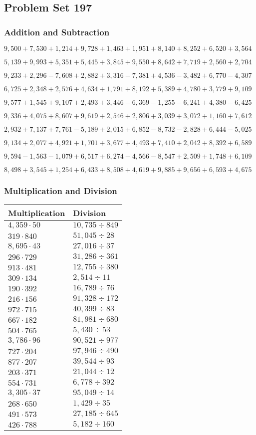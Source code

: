 \hypertarget{problem-set-197}{%
\subsection{Problem Set 197}\label{problem-set-197}}

\hypertarget{addition-and-subtraction}{%
\subsubsection{Addition and
Subtraction}\label{addition-and-subtraction}}

\(9,500+7,530+1,214+9,728+1,463+1,951+8,140+8,252+6,520+3,564\)

\(5,139+9,993+5,351+5,445+3,845+9,550+8,642+7,719+2,560+2,704\)

\(9,233+2,296-7,608+2,882+3,316-7,381+4,536-3,482+6,770-4,307\)

\(6,725+2,348+2,576+4,634+1,791+8,192+5,389+4,780+3,779+9,109\)

\(9,577+1,545+9,107+2,493+3,446-6,369-1,255-6,241+4,380-6,425\)

\(9,336+4,075+8,607+9,619+2,546+2,806+3,039+3,072+1,160+7,612\)

\(2,932+7,137+7,761-5,189+2,015+6,852-8,732-2,828+6,444-5,025\)

\(9,134+2,077+4,921+1,701+3,677+4,493+7,410+2,042+8,392+6,589\)

\(9,594-1,563-1,079+6,517+6,274-4,566-8,547+2,509+1,748+6,109\)

\(8,498+3,545+1,254+6,433+8,508+4,619+9,885+9,656+6,593+4,675\)

\hypertarget{multiplication-and-division}{%
\subsubsection{Multiplication and
Division}\label{multiplication-and-division}}

\begin{longtable}[]{@{}ll@{}}
\toprule
Multiplication & Division\tabularnewline
\midrule
\endhead
\(4,359\cdot50\) & \(10,735÷849\)\tabularnewline
\(319\cdot840\) & \(51,045÷28\)\tabularnewline
\(8,695\cdot43\) & \(27,016÷37\)\tabularnewline
\(296\cdot729\) & \(31,286÷361\)\tabularnewline
\(913\cdot481\) & \(12,755÷380\)\tabularnewline
\(309\cdot134\) & \(2,514÷11\)\tabularnewline
\(190\cdot392\) & \(16,789÷76\)\tabularnewline
\(216\cdot156\) & \(91,328÷172\)\tabularnewline
\(972\cdot715\) & \(40,399÷83\)\tabularnewline
\(667\cdot182\) & \(81,981÷680\)\tabularnewline
\(504\cdot765\) & \(5,430÷53\)\tabularnewline
\(3,786\cdot96\) & \(90,521÷977\)\tabularnewline
\(727\cdot204\) & \(97,946÷490\)\tabularnewline
\(877\cdot207\) & \(39,544÷93\)\tabularnewline
\(203\cdot371\) & \(21,044÷12\)\tabularnewline
\(554\cdot731\) & \(6,778÷392\)\tabularnewline
\(3,305\cdot37\) & \(95,049÷14\)\tabularnewline
\(268\cdot650\) & \(1,429÷35\)\tabularnewline
\(491\cdot573\) & \(27,185÷645\)\tabularnewline
\(426\cdot788\) & \(5,182÷160\)\tabularnewline
\bottomrule
\end{longtable}
